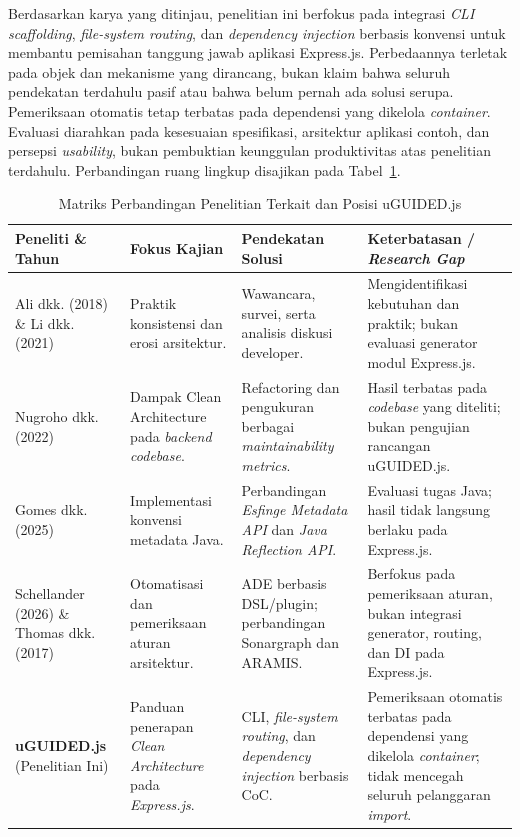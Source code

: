 \documentclass[12pt,a4paper,oneside]{report}
\begin{document}
Berdasarkan karya yang ditinjau, penelitian ini berfokus pada integrasi \textit{CLI \textit{scaffolding}}, \textit{file-system routing}, dan \textit{dependency injection} berbasis konvensi untuk membantu pemisahan tanggung jawab aplikasi Express.js. Perbedaannya terletak pada objek dan mekanisme yang dirancang, bukan klaim bahwa seluruh pendekatan terdahulu pasif atau bahwa belum pernah ada solusi serupa. Pemeriksaan otomatis tetap terbatas pada dependensi yang dikelola \textit{container}. Evaluasi diarahkan pada kesesuaian spesifikasi, arsitektur aplikasi contoh, dan persepsi \textit{usability}, bukan pembuktian keunggulan produktivitas atas penelitian terdahulu. Perbandingan ruang lingkup disajikan pada Tabel~\ref{tab:penelitian_terkait}.

\begin{table}[htbp]
\centering
\small
\caption{Matriks Perbandingan Penelitian Terkait dan Posisi uGUIDED.js}
\label{tab:penelitian_terkait}
\begin{tabularx}{\textwidth}{>{\raggedright\arraybackslash}p{2.6cm} >{\raggedright\arraybackslash}p{2.8cm} >{\raggedright\arraybackslash}p{3.4cm} >{\raggedright\arraybackslash}X}
\toprule
\textbf{Peneliti \& Tahun} & \textbf{Fokus Kajian} & \textbf{Pendekatan Solusi} & \textbf{Keterbatasan / \textit{Research Gap}} \tabularnewline
\midrule
Ali dkk. (2018) \cite{ali2017architecture} \& Li dkk. (2021) \cite{strasser2021understanding} & Praktik konsistensi dan erosi arsitektur. & Wawancara, survei, serta analisis diskusi developer. & Mengidentifikasi kebutuhan dan praktik; bukan evaluasi generator modul Express.js. \tabularnewline
\addlinespace
Nugroho dkk. (2022) \cite{nugroho2022clean} & Dampak Clean Architecture pada \textit{backend \textit{codebase}}. & Refactoring dan pengukuran berbagai \textit{maintainability metrics}. & Hasil terbatas pada \textit{codebase} yang diteliti; bukan pengujian rancangan uGUIDED.js. \tabularnewline
\addlinespace
Gomes dkk. (2025) \cite{esfinge2025coc} & Implementasi konvensi metadata Java. & Perbandingan \textit{Esfinge Metadata API} dan \textit{Java Reflection API}. & Evaluasi tugas Java; hasil tidak langsung berlaku pada Express.js. \tabularnewline
\addlinespace
Schellander (2026) \cite{schellander2024decisions} \& Thomas dkk. (2017) \cite{pruijt2017husacct} & Otomatisasi dan pemeriksaan aturan arsitektur. & ADE berbasis DSL/plugin; perbandingan Sonargraph dan ARAMIS. & Berfokus pada pemeriksaan aturan, bukan integrasi generator, routing, dan DI pada Express.js. \tabularnewline
\addlinespace
\textbf{uGUIDED.js} (Penelitian Ini) & Panduan penerapan \textit{Clean Architecture} pada \textit{Express.js}. & CLI, \textit{file-system routing}, dan \textit{dependency injection} berbasis CoC. & Pemeriksaan otomatis terbatas pada dependensi yang dikelola \textit{container}; tidak mencegah seluruh pelanggaran \textit{import}. \tabularnewline
\bottomrule
\end{tabularx}
\end{table}
\end{document}
